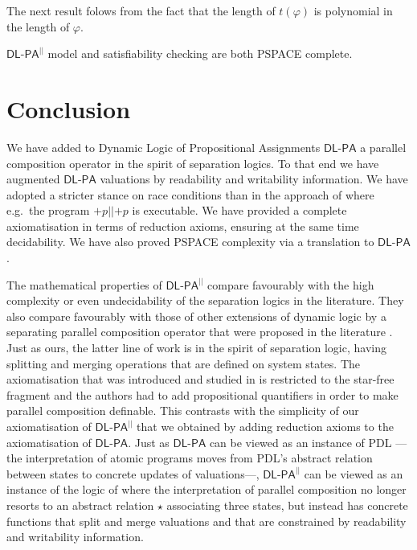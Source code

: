 \documentclass{llncs}
\newcommand{\pll}{ {||} }							%
\newcommand{\Dlpa}{\ensuremath{\mathsf{DL\text{-}PA}}\xspace}
\newcommand{\DlpaPll}{\ensuremath{\mathsf{DL\text{-}PA}^\pll}\xspace}
\newcommand{\assgntop}[1]{{\mathtt {+} #1}}
\renewcommand{\phi}{\varphi}
\begin{document}
The next result folows from the fact that the length of $t(\phi)$ is polynomial in the length of $\phi$. 

\begin{theorem}
\DlpaPll model and satisfiability checking are both PSPACE complete.
\end{theorem}


\section{Conclusion}\label{sec:conclusion}

We have added to Dynamic Logic of Propositional Assignments \Dlpa
a parallel composition operator in the spirit of separation logics. 
To that end we have augmented \Dlpa valuations by readability and writability information. 
We have adopted a stricter stance on race conditions than in the approach of \cite{HerzigEtal-Ijcai19} 
where e.g.\ the program $\assgntop p \pll \assgntop p$ is executable.
We have provided a complete axiomatisation in terms of reduction axioms, 
ensuring at the same time decidability. 
We have also proved PSPACE complexity via a translation to \Dlpa. 

The mathematical properties of \DlpaPll compare favourably with 
the high complexity or even undecidability of the separation logics in the literature. 
They also compare favourably with those of
other extensions of dynamic logic by a separating parallel composition operator that were proposed in the literature
\cite{DBLP:journals/entcs/BenevidesFV11,%
DBLP:journals/igpl/VelosoVB14,%
DBLP:journals/logcom/BalbianiB18}.
Just as ours, the latter line of work is in the spirit of separation logic, having splitting and merging operations that are defined on system states. 
The axiomatisation that was introduced and studied in \cite{DBLP:journals/logcom/BalbianiB18} is restricted to the star-free fragment and the authors had to add propositional quantifiers in order to make parallel composition definable. 
This contrasts with the simplicity of our axiomatisation of \DlpaPll that we obtained by adding reduction axioms to the axiomatisation of \Dlpa. 
Just as \Dlpa can be viewed as an instance of PDL%
---the interpretation of atomic programs moves from PDL's abstract relation between states to concrete updates of valuations\mbox{---,}
\DlpaPll can be viewed as an instance of the logic of \cite{DBLP:journals/entcs/BenevidesFV11}
where the interpretation of parallel composition no longer resorts to
an abstract relation $\star$ associating three states, 
but instead has concrete functions that split and merge valuations and that are constrained by readability and writability information. 
\end{document}
